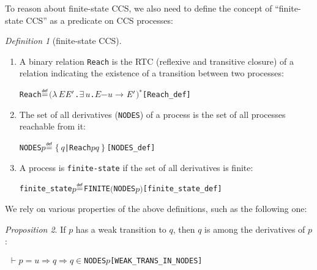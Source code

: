 \documentclass[GCNS]{yincog}
\renewcommand{\HOLConst}[1]{\texttt{#1}}
\renewcommand{\HOLBoundVar}[1]{\ensuremath{\mathit{#1}}}
\renewcommand{\HOLFreeVar}[1]{\ensuremath{\mathit{#1}}}
\renewcommand{\HOLSymConst}[1]{#1}
\renewcommand{\HOLTokenIn}{\ensuremath{\in}}
\renewcommand{\HOLTokenLeftbrace}{\ensuremath{\left \{\right .}}
\renewcommand{\HOLTokenRightbrace}{\ensuremath{\left .\right \}}}
\renewcommand{\HOLTokenDefEquality}{\ensuremath{\mathrel{\overset{\makebox [0pt]{\text{\tiny \textsf{def}}}}{=}}}}
\renewcommand{\HOLTokenExists}{\ensuremath{\exists \,}}
\renewcommand{\HOLTokenLambda}{\ensuremath{\lambda \,}}
\renewcommand{\HOLTokenSupStar}{\ensuremath{{}^{*}}}
\renewcommand{\HOLTokenTurnstile}{\ensuremath{\:\:\vdash}}
\renewcommand{\HOLTokenBar}{\texttt{|}}
\theoremstyle{remark}
\newtheorem{definition}{Definition}[section]
\theoremstyle{theorem}
\newtheorem{proposition}[definition]{Proposition}
\theoremstyle{remark}
\newcommand{\HOLTokenTransBegin}{$-$}
\newcommand{\HOLTokenTransEnd}{$\rightarrow$\xspace}
\newcommand{\HOLTokenWeakTransBegin}{$=$}
\newcommand{\HOLTokenWeakTransEnd}{$\Rightarrow$\xspace}
\renewcommand{\HOLTokenImp}{\ensuremath{\Longrightarrow}}
\begin{document}
To reason about finite-state CCS, we also need to define the concept of
``finite-state CCS'' as a predicate on CCS processes:
%
\begin{definition}[finite-state CCS]
\mbox{}
%
\begin{enumerate}
%
\item A binary relation \texttt{Reach} is the RTC (reflexive and transitive
closure) of a relation indicating the existence of a transition between
two processes:
%
\begin{alltt}
\HOLConst{Reach} \HOLTokenDefEquality{} \ensuremath{(}\HOLTokenLambda{}\HOLBoundVar{E} \ensuremath{\HOLBoundVar{E}\sp{\prime}}. \HOLSymConst{\HOLTokenExists{}}\HOLBoundVar{u}. \HOLBoundVar{E} \HOLTokenTransBegin\HOLBoundVar{u}\HOLTokenTransEnd \ensuremath{\HOLBoundVar{E}\sp{\prime}}\ensuremath{)}\HOLSymConst{\HOLTokenSupStar{}}\hfill[Reach\_def]
\end{alltt}
%
\item The set of all derivatives (\texttt{NODES}) of a process is the set
of all processes reachable from it:
%
\begin{alltt}
\HOLConst{NODES} \HOLFreeVar{p} \HOLTokenDefEquality{} \HOLTokenLeftbrace{}\HOLBoundVar{q} \HOLTokenBar{} \HOLConst{Reach} \HOLFreeVar{p} \HOLBoundVar{q}\HOLTokenRightbrace{}\hfill[NODES\_def]
\end{alltt}
%
\item A process is \texttt{finite-state} if the set of all derivatives
is finite:
%
\begin{alltt}
\HOLConst{finite\_state} \HOLFreeVar{p} \HOLTokenDefEquality{} \HOLConst{FINITE} \ensuremath{(}\HOLConst{NODES} \HOLFreeVar{p}\ensuremath{)}\hfill[finite\_state\_def]
\end{alltt}
%
\end{enumerate}
%
\end{definition}
%
We rely on various properties of the above definitions, such as the following
one:
%
\begin{proposition}
If $p$ has a weak transition to $q$, then $q$ is among the derivatives
of $p$:
%
\begin{alltt}
\HOLTokenTurnstile{} \HOLFreeVar{p} \HOLTokenWeakTransBegin\HOLFreeVar{u}\HOLTokenWeakTransEnd \HOLFreeVar{q} \HOLSymConst{\HOLTokenImp{}} \HOLFreeVar{q} \HOLSymConst{\HOLTokenIn{}} \HOLConst{NODES} \HOLFreeVar{p}\hfill[WEAK\_TRANS\_IN\_NODES]
\end{alltt}
%
\end{proposition}
\end{document}
